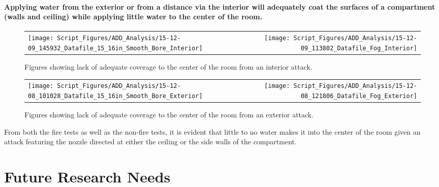 \documentclass{article}
\begin{document}
\clearpage

\paragraph{Applying water from the exterior or from a distance via the interior will adequately coat the surfaces of a compartment (walls and ceiling) while applying little water to the center of the room.} \mbox{}


\begin{figure}[ht]
\begin{tabular*}{\textwidth}{lr}
\texttt{[image: Script\_Figures/ADD\_Analysis/15-12-09\_145932\_Datafile\_15\_16in\_Smooth\_Bore\_Interior]} &
\texttt{[image: Script\_Figures/ADD\_Analysis/15-12-09\_113802\_Datafile\_Fog\_Interior]} \\
\end{tabular*}
\caption{Figures showing lack of adequate coverage to the center of the room from an interior attack.}
\label{fig:Lack_of_Center_Coverage_Interior}
\end{figure}


\begin{figure}[ht]
\begin{tabular*}{\textwidth}{lr}
\texttt{[image: Script\_Figures/ADD\_Analysis/15-12-08\_101028\_Datafile\_15\_16in\_Smooth\_Bore\_Exterior]} &
\texttt{[image: Script\_Figures/ADD\_Analysis/15-12-08\_121806\_Datafile\_Fog\_Exterior]} \\
\end{tabular*}
\caption{Figures showing lack of adequate coverage to the center of the room from an exterior attack.}
\label{fig:Lack_of_Center_Coverage_Exterior}
\end{figure}

From both the fire tests as well as the non-fire tests, it is evident that little to no water makes it into the center of the room given an attack featuring the nozzle directed at either the ceiling or the side walls of the compartment.

\vspace*{\baselineskip}

\clearpage

\section{Future Research Needs}
\end{document}
